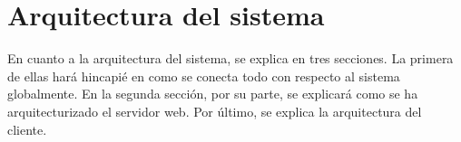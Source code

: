 \section{Arquitectura del sistema}

En cuanto a la arquitectura del sistema, se explica en tres secciones. La primera de ellas hará hincapié en como se conecta todo con respecto al sistema globalmente. En la segunda sección, por su parte, se explicará como se ha arquitecturizado el servidor web. Por último, se explica la arquitectura del cliente.



